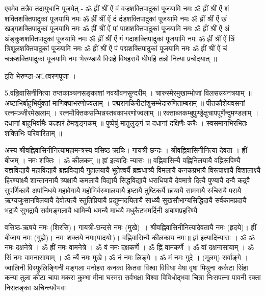 एवमेव तत्रैव तदायुधानि पूजयेत् -
ॐ ह्रीं श्रीं ऐं वं वज्रशक्तिपादुकां पूजयामि नमः
ॐ ह्रीं श्रीं ऐं शं शक्तिशक्तिपादुकां पूजयामि नमः
ॐ ह्रीं श्रीं ऐं दं दंडशक्तिपादुकां पूजयामि नमः
ॐ ह्रीं श्रीं ऐं खं खड्गशक्तिपादुकां पूजयामि नमः
ॐ ह्रीं श्रीं ऐं पां पाशशक्तिपादुकां पूजयामि नमः
ॐ ह्रीं श्रीं ऐं अं अंङ्कुशशक्तिपादुकां पूजयामि नमः
ॐ ह्रीं श्रीं ऐं गं गदाशक्तिपादुकां पूजयामि नमः
ॐ ह्रीं श्रीं ऐं त्रिं त्रिशूलशक्तिपादुकां पूजयामि नमः
ॐ ह्रीं श्रीं ऐं पं पद्मशक्तिपादुकां पूजयामि नमः
ॐ ह्रीं श्रीं ऐं चं चक्रशक्तिपादुकां पूजयामि नमः
भेरुण्डायै विद्महे विषहरायै धीमहि तन्नो नित्या प्रचोदयात् ॥

इति भेरुण्डा-अावरणपूजा ।

5.वह्निवासिनीनित्या
तप्तकाञ्चनसङ्काशां नवयौवनसुन्दरीम् । चारुस्मेरमुखाम्भोजां विलसन्नयनत्रयाम् ॥
अष्टाभिर्बाहुभिर्युक्तां माणिक्याभरणोज्वलाम् । पद्मरागकिरीटांशुसम्भेदारुणिताम्बराम् ॥
पीतकौशेयवसनां रत्नमञ्जीरमेखलाम् । रत्नमौक्तिकसम्भिन्नस्तबकाभरणोज्वलाम् ॥
रक्ताब्जकम्बुपुण्ड्रेक्षुचापपूर्णेन्दुमण्डलाम् । दधानां बाहुभिर्वामैः कल्हारं हेमशृङ्गकम् ॥
पुष्पेषुं मातुलुङ्गं च दधानां दक्षिणैः करैः । स्वसमानभिरभितः शक्तिभिः परिवारिताम् ॥

अस्य श्रीवह्निवासिनीनित्यामहामन्त्रस्य वसिष्ठ ऋषिः। गायत्री छन्दः । श्रीवह्निवासिनीनित्या देवता । ह्रीं बीजम् । नमः शक्तिः । ॐ कीलकम् ॥
ह्रां इत्यादिः न्यासः ॥
वह्निवासिन्यै वह्निनिलयायै वह्निरूपिण्यै यज्ञविद्यायै महाविद्यायै ब्रह्मविद्यायै गुहालयायै भूतेश्वर्यै ब्रह्मधात्र्यै विमलायै कनकप्रभायै विरूपाक्षायै विशालाक्ष्यै हिरण्याक्ष्यै शान्ताननायै त्र्यक्षायै कमलायै विद्यायै सिद्धविद्यायै धराधिपायै देवमात्रे दित्यै पुण्यायै दन्वै कद्र्वै सुपर्णिकायै अपांनिधये महावेगायै महोभिर्वरुणालयायै इष्टायै तुष्टिकर्यै छायायै सामगायै रुचिरायै परायै ऋग्यजुःसानविलयायै देवोत्पत्यै स्तुतिप्रियायै प्रद्युम्नदयितायै साध्व्यै सुखसौभाग्यसिद्धिदायै सर्वकामप्रदायै भद्रायै सुभद्रायै सर्वमङ्गलायै धामिन्यै धमन्यै माध्व्यै मधुकैटभमर्दिनी अबाणप्रहरिण्यै

वसिष्ठ-ऋषये नमः (शिरसि)। गायत्री-छन्दसे नमः (मुखे)~। श्रीवह्निवासिनीनित्यादेवतायै नमः (हृदये)। ह्रीं बीजाय नमः (गुह्ये)। नमः शक्तये नमः(पादयोः)।
वह्निवासिन्यै कीलकाय नमः॥
ह्रां इत्यादिन्यासः ।
ॐ ॐ नमः दक्षनेत्रे । ॐ ह्रीं नमः वामनेत्रे । ॐ वं नमः दक्षकर्णे । ॐ ह्निं वामकर्णे । ॐ वां दक्षनासायाम् । ॐ सिं नमः वामनासायाम् । ॐ न्यैं नमः मुखे। ॐ नं नमः लिङ्गे । ॐ मं नमः गुदे । (मूलम्) सर्वाङ्गे ।
ज्वालिनी विस्फुलिङ्गिनी मङ्गला मनोहरा कनका कितवा विश्वा विविधा मेषा वृषा मिथुना कर्कटा सिंहा कन्या तुला कीटा चापा मकरा कुम्भा मीना घस्मरा सर्वभक्षा विश्वा विविधोद्भवा चित्रा निःसपत्ना पावनी रक्ता निरातङ्का अचिन्त्यवैभवा 

